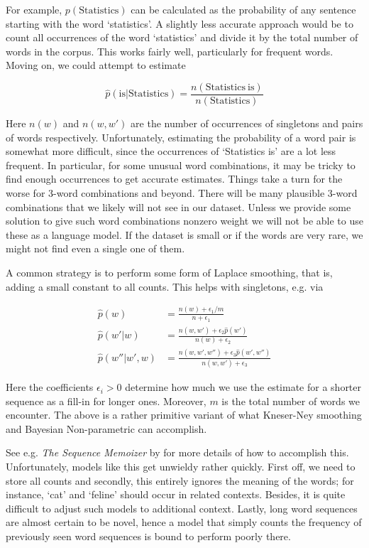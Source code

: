 For example, $p(\mathrm{Statistics})$ can be calculated as the probability of any sentence starting with the word ‘statistics’. A slightly less accurate approach would be to count all occurrences of the word ‘statistics’ and divide it by the total number of words in the corpus. This works fairly well, particularly for frequent words. Moving on, we could attempt to estimate

$$\hat{p}(\mathrm{is}|\mathrm{Statistics}) = \frac{n(\mathrm{Statistics~is})}{n(\mathrm{Statistics})}$$

Here $n(w)$ and $n(w, w')$ are the number of occurrences of singletons and pairs of words respectively. Unfortunately, estimating the probability of a word pair is somewhat more difficult, since the occurrences of ‘Statistics is’ are a lot less frequent. In particular, for some unusual word combinations, it may be tricky to find enough occurrences to get accurate estimates. Things take a turn for the worse for 3-word combinations and beyond. There will be many plausible 3-word combinations that we likely will not see in our dataset. Unless we provide some solution to give such word combinations nonzero weight we will not be able to use these as a language model. If the dataset is small or if the words are very rare, we might not find even a single one of them.

A common strategy is to perform some form of Laplace smoothing, that is, adding a small constant to all counts. 
This helps with singletons, e.g. via

$$
\begin{aligned}
    \hat{p}(w) & = \frac{n(w) + \epsilon_1/m}{n + \epsilon_1} \\
    \hat{p}(w'|w) & = \frac{n(w,w') + \epsilon_2 \hat{p}(w')}{n(w) + \epsilon_2} \\
    \hat{p}(w''|w',w) & = \frac{n(w,w',w'') + \epsilon_3 \hat{p}(w',w'')}{n(w,w') + \epsilon_3}
\end{aligned}
$$

Here the coefficients $\epsilon_i > 0$ determine how much we use the estimate for a shorter sequence as a fill-in for longer ones. Moreover, $m$ is the total number of words we encounter. The above is a rather primitive variant of what Kneser-Ney smoothing and Bayesian Non-parametric can accomplish. 

See e.g. \textit{The Sequence Memoizer} by \citep{Wood2011} for more details of how to accomplish this. Unfortunately, models like this get unwieldy rather quickly. First off, we need to store all counts and secondly, this entirely ignores the meaning of the words; for instance, ‘cat’ and ‘feline’ should occur in related contexts. Besides, it is quite difficult to adjust such models to additional context. Lastly, long word sequences are almost certain to be novel, hence a model that simply counts the frequency of previously seen word sequences is bound to perform poorly there.

